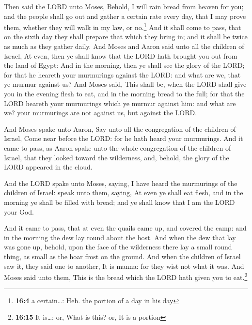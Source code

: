 Then said the LORD unto Moses, Behold, I will rain bread
from heaven for you; and the people shall go out and gather a certain
rate every day, that I may prove them, whether they will walk in my law,
or no.\footnote{\textbf{16:4} a certain\ldots: Heb. the portion of a day
  in his day}  And it shall come to pass, that on the
sixth day they shall prepare that which they bring in; and it shall be
twice as much as they gather daily.  And Moses and Aaron
said unto all the children of Israel, At even, then ye shall know that
the LORD hath brought you out from the land of Egypt:  And
in the morning, then ye shall see the glory of the LORD; for that he
heareth your murmurings against the LORD: and what are we, that ye
murmur against us?  And Moses said, This shall be, when
the LORD shall give you in the evening flesh to eat, and in the morning
bread to the full; for that the LORD heareth your murmurings which ye
murmur against him: and what are we? your murmurings are not against us,
but against the LORD.

 And Moses spake unto Aaron, Say unto all the congregation
of the children of Israel, Come near before the LORD: for he hath heard
your murmurings.  And it came to pass, as Aaron spake
unto the whole congregation of the children of Israel, that they looked
toward the wilderness, and, behold, the glory of the LORD appeared in
the cloud.

 And the LORD spake unto Moses, saying,  I
have heard the murmurings of the children of Israel: speak unto them,
saying, At even ye shall eat flesh, and in the morning ye shall be
filled with bread; and ye shall know that I am the LORD your God.

 And it came to pass, that at even the quails came up,
and covered the camp: and in the morning the dew lay round about the
host.  And when the dew that lay was gone up, behold,
upon the face of the wilderness there lay a small round thing, as small
as the hoar frost on the ground.  And when the children
of Israel saw it, they said one to another, It is manna: for they wist
not what it was. And Moses said unto them, This is the bread which the
LORD hath given you to eat.\footnote{\textbf{16:15} It is\ldots: or,
  What is this? or, It is a portion}

